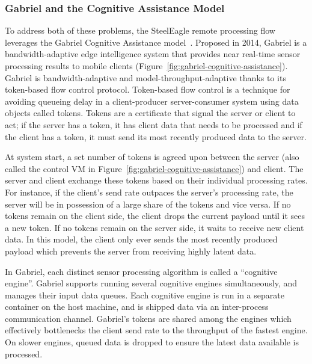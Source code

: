 \subsubsection{Gabriel and the Cognitive Assistance Model}
To address both of these problems, the SteelEagle remote processing flow leverages the Gabriel Cognitive Assistance model~\cite{Ha2014}. Proposed in 2014, Gabriel is a bandwidth-adaptive edge intelligence system that provides near real-time sensor processing results to mobile clients (Figure~\ref{fig:gabriel-cognitive-assistance}). Gabriel is bandwidth-adaptive and model-throughput-adaptive thanks to its token-based flow control protocol. Token-based flow control is a technique for avoiding queueing delay in a client-producer server-consumer system using data objects called tokens. Tokens are a certificate that signal the server or client to act; if the server has a token, it has client data that needs to be processed and if the client has a token, it must send its most recently produced data to the server. 

At system start, a set number of tokens is agreed upon between the server (also called the control VM in Figure~\ref{fig:gabriel-cognitive-assistance}) and client. The server and client exchange these tokens based on their individual processing rates. For instance, if the client's send rate outpaces the server's processing rate, the server will be in possession of a large share of the tokens and vice versa. If no tokens remain on the client side, the client drops the current payload until it sees a new token. If no tokens remain on the server side, it waits to receive new client data. In this model, the client only ever sends the most recently produced payload which prevents the server from receiving highly latent data.

In Gabriel, each distinct sensor processing algorithm is called a ``cognitive engine''. Gabriel supports running several cognitive engines simultaneously, and manages their input data queues. Each cognitive engine is run in a separate container on the host machine, and is shipped data via an inter-process communication channel. Gabriel's tokens are shared among the engines which effectively bottlenecks the client send rate to the throughput of the fastest engine. On slower engines, queued data is dropped to ensure the latest data available is processed.

